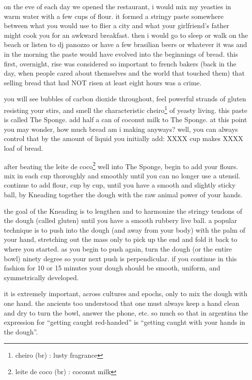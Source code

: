 on the eve of each day we opened the restaurant, i would mix my
yeasties in warm water with a few cups of flour. it formed a stringy
paste somewhere between what you would use to flier a city and what
your girlfriend's father might cook you for an awkward
breakfast. then i would go to sleep or walk on the beach or listen to
dj panozzo or have a few brasilian beers or whatever it was and in the
morning the paste would have evolved into the beginnings of
bread. this first, overnight, rise was considered so important to
french bakers (back in the day, when people cared about themselves and
the world that touched them) that selling bread that had NOT risen at
least eight hours was a crime.

you will see bubbles of carbon dioxide throughout, feel powerful
strands of gluten resisting your stirs, and smell the characteristic
cheiro\footnote{cheiro (br) : lusty fragrance} of yeasty living. this
paste is called The Sponge. add half a can of coconut milk to The
Sponge. at this point you may wonder, how much bread am i making
anyways? well, you can always control that by the amount of liquid you
initially add: XXXX cup makes XXXX loaf of bread.

after beating the leite de coco\footnote{leite de coco (br) : coconut
milk} well into The Sponge, begin to add your flours. mix in each cup
thoroughly and smoothly until you can no longer use a
utensil. continue to add flour, cup by cup, until you have a smooth
and slightly sticky ball, by Kneading together the dough with the raw
animal power of your hands.

the goal of the Kneading is to lengthen and to harmonize the stringy
tendons of the dough (called gluten) until you have a smooth rubbery
live ball. a popular technique is to push into the dough (and away
from your body) with the palm of your hand, stretching out the mass
only to pick up the end and fold it back to where you started. as you
begin to push again, turn the dough (or the entire bowl) ninety degree
so your next push is perpendicular. if you continue in this fashion
for 10 or 15 minutes your dough should be smooth, uniform, and
symmetrically developed.
	
it is extremely important, across cultures and epochs, only to mix the
dough with one hand. the ancients too understood that one must always
keep a hand clean and dry to turn the bowl, answer the phone, etc. so
much so that in argentina the expression for ``getting caught
red-handed'' is ``getting caught with your hands in the dough''.

